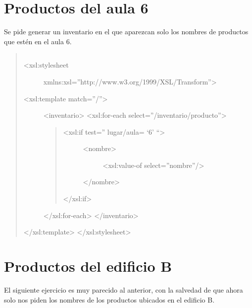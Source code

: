 \documentclass[letterpaper,10pt,spanish]{sphinxmanual}
\begin{document}
\section{Productos del aula 6}
\label{ejercicios/xslt/anexo_ejercicios_xslt:productos-del-aula-6}
Se pide generar un inventario en el que aparezcan solo los nombres de productos que estén en el aula 6.
\begin{quote}

\begin{Verbatim}[commandchars=\\\{\}]

\end{Verbatim}
\begin{description}
\item[{\textless{}xsl:stylesheet}] \leavevmode
xmlns:xsl=''http://www.w3.org/1999/XSL/Transform''\textgreater{}

\item[{\textless{}xsl:template match=''/''\textgreater{}}] \leavevmode
\textless{}inventario\textgreater{}
\textless{}xsl:for-each select=''/inventario/producto''\textgreater{}
\begin{quote}
\begin{description}
\item[{\textless{}xsl:if test='' lugar/aula= `6' ``\textgreater{}}] \leavevmode\begin{description}
\item[{\textless{}nombre\textgreater{}}] \leavevmode
\textless{}xsl:value-of select=''nombre''/\textgreater{}

\end{description}

\textless{}/nombre\textgreater{}

\end{description}

\textless{}/xsl:if\textgreater{}
\end{quote}

\textless{}/xsl:for-each\textgreater{}
\textless{}/inventario\textgreater{}

\end{description}

\textless{}/xsl:template\textgreater{}
\textless{}/xsl:stylesheet\textgreater{}
\end{quote}


\section{Productos del edificio B}
\label{ejercicios/xslt/anexo_ejercicios_xslt:id1}
El siguiente ejercicio es muy parecido al anterior, con la salvedad de que ahora solo nos piden los nombres de los productos ubicados en el edificio B.
\end{document}
